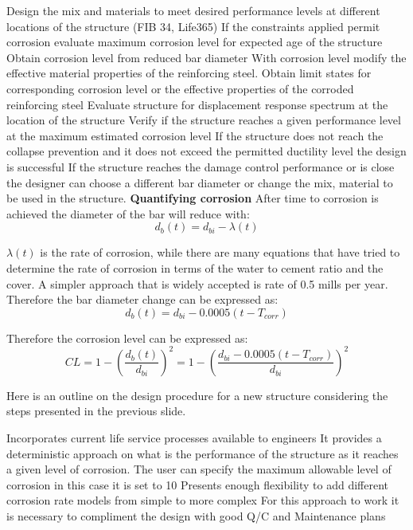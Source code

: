 Design the mix and materials to meet desired performance levels at different locations of the structure (FIB 34, Life365)
If the constraints applied permit corrosion evaluate maximum corrosion level for expected age of the structure
Obtain corrosion level from reduced bar diameter
With corrosion level modify the  effective material properties of the reinforcing steel. 
Obtain limit states for corresponding corrosion level or the effective properties of the corroded reinforcing steel
Evaluate structure for displacement response spectrum at the location of the structure
Verify if the structure reaches a given performance level at the maximum estimated corrosion level
If the structure does not reach the collapse prevention and it does not exceed the permitted ductility level the design is successful
If the structure reaches the damage control performance or is close the designer can choose a different bar diameter or change the mix, material to be used in the structure.
\textbf{Quantifying corrosion}
After time to corrosion is achieved the diameter of the bar will reduce with:
\begin{equation}
    d_{b}(t)=d_{bi}-\lambda(t)
\end{equation}

$\lambda(t)$ is the rate of corrosion, while there are many equations that have tried to determine the rate of corrosion in terms of the water to cement ratio and the cover. A simpler approach that is widely accepted is rate of 0.5 mills per year. Therefore the bar diameter change can be expressed as:
\begin{equation}
    d_{b}(t)=d_{bi}-0.0005(t-T_{corr})
\end{equation}

Therefore the corrosion level can be expressed as:
\begin{equation}
    CL=1-\left(\frac{d_{b}(t)}{d_{bi}}\right)^2=1-\left(\frac{d_{bi}-0.0005(t-T_{corr})}{d_{bi}}\right)^2
\end{equation}

Here is an outline on the design procedure for a new structure considering the steps presented in the previous slide.

Incorporates current life service processes available to engineers
It provides a deterministic approach on what is the performance of the structure as it reaches a given level of corrosion.
The user can specify the maximum allowable level of corrosion in this case it is set to 10%
Presents enough flexibility to add different corrosion rate models from simple to more complex
For this approach to work it is necessary to compliment the design with  good Q/C and Maintenance plans

